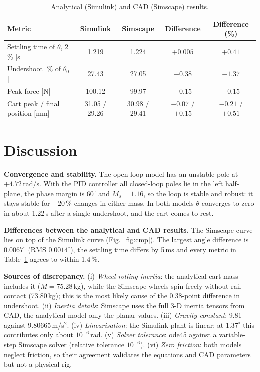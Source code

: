 \documentclass[10pt,a4paper]{article}
\newcommand{\hdr}{\rowcolor{headgrey}}
\begin{document}
\begin{table}[H]
\centering\small
\caption{Analytical (Simulink) and CAD (Simscape) results.}
\label{tab:cmp}
\begin{tabular}{|l|c|c|c|c|}
\hline \hdr
\textbf{Metric} & \textbf{Simulink} & \textbf{Simscape} & \textbf{Difference} & \textbf{Difference (\%)} \\ \hline
Settling time of $\theta$, 2\,\% [s] & 1.219 & 1.224 & $+0.005$ & $+0.41$ \\ \hline
Undershoot [\% of $\theta_0$] & 27.43 & 27.05 & $-0.38$ & $-1.37$ \\ \hline
Peak force [N] & 100.12 & 99.97 & $-0.15$ & $-0.15$ \\ \hline
Cart peak / final position [mm] & 31.05 / 29.26 & 30.98 / 29.41 & $-0.07$ / $+0.15$ & $-0.21$ / $+0.51$ \\ \hline
\end{tabular}
\end{table}

\section{Discussion}
\textbf{Convergence and stability.} The open-loop model has an unstable pole at $+4.72$\,rad/s. With the
PID controller all closed-loop poles lie in the left half-plane, the phase margin is $60^\circ$ and $M_s =
1.16$, so the loop is stable and robust: it stays stable for $\pm20\,\%$ changes in either mass. In both
models $\theta$ converges to zero in about 1.22\,s after a single undershoot, and the cart comes to rest.

\textbf{Differences between the analytical and CAD results.} The Simscape curve lies on top of the
Simulink curve (Fig.~\ref{fig:cmp}). The largest angle difference is $0.0067^\circ$ (RMS $0.0014^\circ$),
the settling time differs by 5\,ms and every metric in Table~\ref{tab:cmp} agrees to within 1.4\,\%.

\textbf{Sources of discrepancy.} (i) \emph{Wheel rolling inertia}: the analytical cart mass includes it
($M = 75.28$\,kg), while the Simscape wheels spin freely without rail contact (73.80\,kg); this is the most
likely cause of the 0.38-point difference in undershoot. (ii) \emph{Inertia details}: Simscape uses the full 3-D
inertia tensors from CAD, the analytical model only the planar values. (iii) \emph{Gravity constant}:
9.81 against 9.80665\,m/s$^2$. (iv) \emph{Linearisation}: the Simulink plant is linear; at $1.37^\circ$ this
contributes only about $10^{-6}$\,rad. (v) \emph{Solver tolerance}: ode45 against a variable-step Simscape
solver (relative tolerance $10^{-6}$). (vi) \emph{Zero friction}: both models neglect friction, so their
agreement validates the equations and CAD parameters but not a physical rig.
\end{document}
